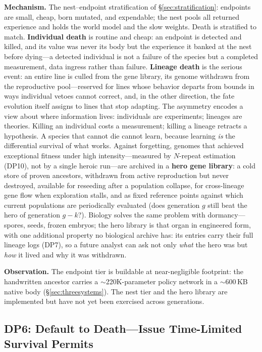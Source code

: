 \documentclass[11pt,a4paper]{article}
\begin{document}
\noindent\textbf{Mechanism.} The nest--endpoint stratification of \S\ref{sec:stratification}: endpoints are small, cheap, born mutated, and expendable; the nest pools all returned experience and holds the world model and the slow weights. Death is stratified to match. \textbf{Individual death} is routine and cheap: an endpoint is detected and killed, and its value was never its body but the experience it banked at the nest before dying---a detected individual is not a failure of the species but a completed measurement, data ingress rather than failure. \textbf{Lineage death} is the serious event: an entire line is culled from the gene library, its genome withdrawn from the reproductive pool---reserved for lines whose behavior departs from bounds in ways individual vetoes cannot correct, and, in the other direction, the fate evolution itself assigns to lines that stop adapting. The asymmetry encodes a view about where information lives: individuals are experiments; lineages are theories. Killing an individual costs a measurement; killing a lineage retracts a hypothesis. A species that cannot die cannot learn, because learning \emph{is} the differential survival of what works. Against forgetting, genomes that achieved exceptional fitness under high intensity---measured by $N$-repeat estimation (DP10), not by a single heroic run---are archived in a \textbf{hero gene library}: a cold store of proven ancestors, withdrawn from active reproduction but never destroyed, available for reseeding after a population collapse, for cross-lineage gene flow when exploration stalls, and as fixed reference points against which current populations are periodically evaluated (does generation $g$ still beat the hero of generation $g{-}k$?). Biology solves the same problem with dormancy---spores, seeds, frozen embryos; the hero library is that organ in engineered form, with one additional property no biological archive has: its entries carry their full lineage logs (DP7), so a future analyst can ask not only \emph{what} the hero was but \emph{how} it lived and why it was withdrawn.

\noindent\textbf{Observation.} The endpoint tier is buildable at near-negligible footprint: the handwritten ancestor carries a $\sim$220K-parameter policy network in a $\sim$600\,KB native body (\S\ref{sec:threesystems}). The nest tier and the hero library are implemented but have not yet been exercised across generations.

\subsection{DP6: Default to Death---Issue Time-Limited Survival Permits}
\label{dp:lease}
\end{document}
